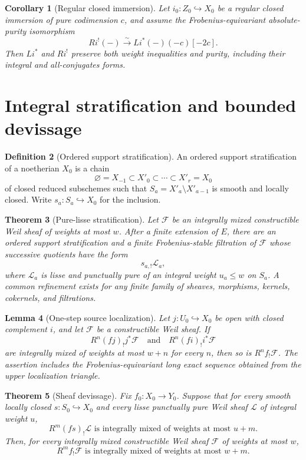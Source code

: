 \documentclass[10pt]{article}
\newtheorem{theorem}{Theorem}[section]
\newtheorem{lemma}[theorem]{Lemma}
\newtheorem{corollary}[theorem]{Corollary}
\theoremstyle{definition}
\newtheorem{definition}[theorem]{Definition}
\begin{document}
\begin{corollary}[Regular closed immersion]
Let \(i_0:Z_0\hookrightarrow X_0\) be a regular closed immersion of pure
codimension \(c\), and assume the Frobenius-equivariant absolute-purity
isomorphism
\[
                    Ri^!(-)\xrightarrow{\sim}Li^*(-)(-c)[-2c].
\]
Then \(Li^*\) and \(Ri^!\) preserve both weight inequalities and purity,
including their integral and all-conjugates forms.
\end{corollary}

\section{Integral stratification and bounded devissage}

\begin{definition}[Ordered support stratification]
An ordered support stratification of a noetherian \(X_0\) is a chain
\[
 \varnothing=X_{-1}\subset X'_0\subset\cdots\subset X'_r=X_0
\]
of closed reduced subschemes such that
\(S_a=X'_a\setminus X'_{a-1}\) is smooth and locally closed.  Write
\(s_a:S_a\hookrightarrow X_0\) for the inclusion.
\end{definition}

\begin{theorem}[Pure-lisse stratification]
Let \(\mathcal F\) be an integrally mixed constructible Weil sheaf of
weights at most \(w\).  After a finite extension of \(E\), there are an
ordered support stratification and a finite Frobenius-stable filtration of
\(\mathcal F\) whose successive quotients have the form
\[
                         s_{a,!}\mathcal L_a,
\]
where \(\mathcal L_a\) is lisse and punctually pure of an integral weight
\(u_a\le w\) on \(S_a\).  A common refinement exists for any finite family
of sheaves, morphisms, kernels, cokernels, and filtrations.
\end{theorem}

\begin{lemma}[One-step source localization]
Let \(j:U_0\hookrightarrow X_0\) be open with closed complement \(i\), and
let \(\mathcal F\) be a constructible Weil sheaf.  If
\[
 R^n(fj)_!j^*\mathcal F
 \quad\text{and}\quad
 R^n(fi)_!i^*\mathcal F
\]
are integrally mixed of weights at most \(w+n\) for every \(n\), then so is
\(R^nf_!\mathcal F\).  The assertion includes the Frobenius-equivariant
long exact sequence obtained from the upper localization triangle.
\end{lemma}

\begin{theorem}[Sheaf devissage]
Fix \(f_0:X_0\to Y_0\).  Suppose that for every smooth locally closed
\(s:S_0\hookrightarrow X_0\) and every lisse punctually pure Weil sheaf
\(\mathcal L\) of integral weight \(u\),
\[
              R^m(fs)_!\mathcal L
 \text{ is integrally mixed of weights at most }u+m.
\]
Then, for every integrally mixed constructible Weil sheaf \(\mathcal F\)
of weights at most \(w\),
\[
              R^mf_!\mathcal F
 \text{ is integrally mixed of weights at most }w+m.
\]
\end{theorem}
\end{document}
